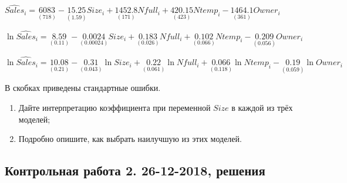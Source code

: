 \begin{enumerate}
$\widehat{Sales}_i = \underset{(718)}{6083} - \underset{(1.59)}{15.25}Size_i +
\underset{(171)}{1452.8} Nfull_i + \underset{(423)}{420.15} Ntemp_i -
\underset{(361)}{1464.1} Owner_i$

$\ln \widehat{Sales}_i = \underset{(0.11)}{8.59} - \underset{(0.00024)}{0.0024}Size_i +
\underset{(0.026)}{0.183} Nfull_i + \underset{(0.066)}{0.102} Ntemp_i -
\underset{(0.056)}{0.209} Owner_i$

$\ln \widehat{Sales}_i = \underset{(0.21)}{10.08} - \underset{(0.043)}{0.31}\ln Size_i +
\underset{(0.061)}{0.22} \ln Nfull_i + \underset{(0.118)}{0.066} \ln Ntemp_i -
\underset{(0.059)}{0.19} \ln Owner_i$

В скобках приведены стандартные ошибки.

\begin{enumerate}
    \item Дайте интерпретацию коэффициента при переменной $Size$ в каждой из трёх моделей;
    \item Подробно опишите, как выбрать наилучшую из этих моделей.
\end{enumerate}
\end{enumerate}


\subsection{Контрольная работа 2. 26-12-2018, решения}

